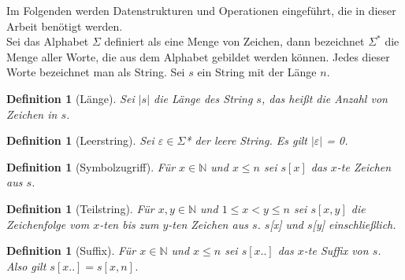 \documentclass[a4paper,11pt]{scrartcl}%
\theoremstyle{nonumberplain}
\theoremstyle{change}
\newtheorem{definition}[theorem]{Definition}
\theoremstyle{nonumberplain}
\theoremstyle{change}
\theoremstyle{nonumberplain}
\begin{document}
	Im Folgenden werden Datenstrukturen und Operationen eingeführt, die in dieser Arbeit benötigt werden.\\
	Sei das Alphabet $\Sigma$ definiert als eine Menge von Zeichen, dann bezeichnet $\Sigma^{*}$ die Menge aller Worte, die aus dem Alphabet gebildet werden können. Jedes dieser Worte bezeichnet man als String.
	Sei $s$ ein String mit der Länge $n$.
	
	\begin{definition}[Länge]
		Sei $|s|$ die Länge des String $s$, das heißt die Anzahl von Zeichen in $s$.
	\end{definition}
	
	\begin{definition}[Leerstring]
		Sei $\varepsilon \in \Sigma$* der leere String. Es gilt $|\varepsilon|$ = 0.
	\end{definition}
	
	\begin{definition}[Symbolzugriff]
		Für $x \in \mathbb{N}$ und $x \leq n$ sei $s[x]$ das $x$-te Zeichen aus $s$.
	\end{definition}
	
	\begin{definition}[Teilstring]
		Für $x,y \in \mathbb{N}$ und $1 \leq x < y \leq n$ sei $s[x,y]$ die Zeichenfolge vom $x$-ten bis zum $y$-ten Zeichen aus $s$. $s$[x] und $s$[y] einschließlich.
	\end{definition}
	
	\begin{definition}[Suffix]
		 Für $x \in \mathbb{N}$ und $x \leq n$ sei $s[x..]$ das $x$-te Suffix von $s$. Also gilt $s[x..] = s[x,n]$.
	\end{definition}
	
\end{document}
